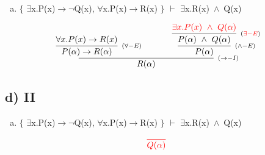 \documentclass[aspectratio=43]{beamer}
\newcommand{\ria}{$\rightarrow$}
\newcommand{\fall}{$\forall$}
\newcommand{\ex}{$\exists$}
\newcommand{\nao}{$\neg$}
\newcommand{\andd}{$\wedge$}
\begin{document}
    \begin{frame}[fragile]
    
    	\begin{enumerate}[d)]
			\item $\{$ \ex x.P(x)\ria \nao Q(x), \fall x.P(x)\ria R(x) $\}$ $\vdash$ \ex x.R(x)\ \andd\ Q(x) \\
		\end{enumerate}
        
        \vspace{65pt}
        
        \[
        \begin{array}{c}
		
        	\infer[_{(\to -I)}]
            	{R(\alpha)}
            	{\infer[_{(\forall -E)}]
                	{P(\alpha) \rightarrow R(\alpha)} 
                    {\forall x.P(x)\to R(x)} 
            	\hspace{35pt}
                \infer[_{(\land -E)}] 
                	{P(\alpha)}
                    {\infer[_{(\textcolor{red}{\exists -E})}]
                    	{P(\alpha)\ \land \ Q(\alpha)}
                    	{\textcolor{red}{\exists x.P(x)\ \land \ Q(\alpha)}}
                    }
                }
		\end{array}
        \]
        
	\end{frame}
    
    \subsection{d) II}
    
    \begin{frame}[fragile]
    
    	\begin{enumerate}[d)]
			\item $\{$ \ex x.P(x)\ria \nao Q(x), \fall x.P(x)\ria R(x) $\}$ $\vdash$ \ex x.R(x)\ \andd\ Q(x) \\
		\end{enumerate}
        
        \vspace{75pt}
        
        \[
        \begin{array}{c}
		
        	\textcolor{red}{
            \infer[_{}]
            	{Q(\alpha)}
            	{}
        	}
		\end{array}
        \]
        
	\end{frame}
    
\end{document}
